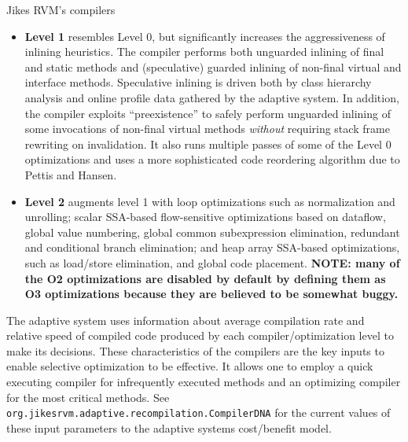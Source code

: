 \begin{section}{Jikes RVM's compilers}
\begin{itemize}
\begin{itemize}
        \item \textbf{Level 1} resembles Level 0, but significantly increases the aggressiveness of inlining heuristics. The compiler performs both unguarded inlining of final and static methods and (speculative) guarded inlining of non-final virtual and interface methods. Speculative inlining is driven both by class hierarchy analysis and online profile data gathered by the adaptive system. In addition, the compiler exploits ``preexistence'' to safely perform unguarded inlining of some invocations of non-final virtual methods \textit{without} requiring stack frame rewriting on invalidation.  It also runs multiple passes of some of the Level 0 optimizations and uses a more sophisticated code reordering algorithm due to Pettis and Hansen.
        \item \textbf{Level 2} augments level 1 with loop optimizations such as normalization and unrolling; scalar SSA-based flow-sensitive optimizations based on dataflow, global value numbering, global common subexpression elimination, redundant and conditional branch elimination; and heap array SSA-based optimizations, such as load/store elimination, and global code placement.  \textbf{NOTE: many of the O2 optimizations are disabled by default by defining them as O3 optimizations because they are believed to be somewhat buggy.} 
      \end{itemize}
\end{itemize}

The adaptive system uses information about average compilation rate and relative speed of compiled code produced by each compiler/optimization level to make its decisions. These characteristics of the compilers are the key inputs to enable selective optimization to be effective. It allows one to employ a quick executing compiler for infrequently executed methods and an optimizing compiler for the most critical methods. See \texttt{org.jikes\-rvm.a\-dap\-ti\-ve.re\-com\-pi\-la\-tion.Com\-pi\-ler\-DNA} for the current values of these input parameters to the adaptive systems cost/benefit model.

\end{section}
